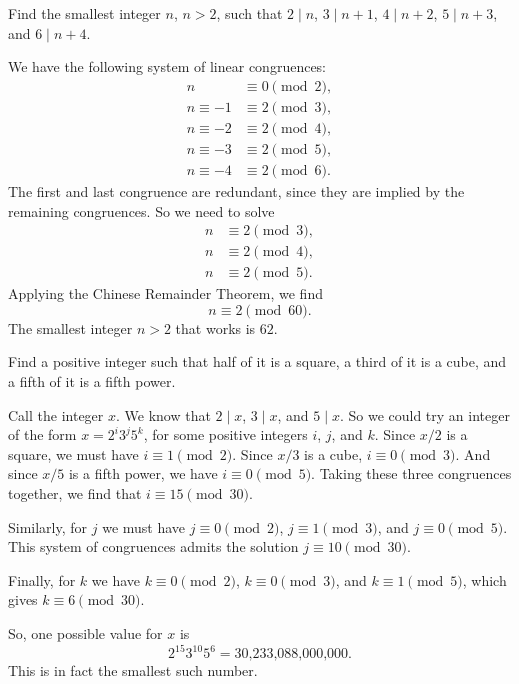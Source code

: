  Find the smallest integer $n$, $n > 2$, such that
$2\mid n$, $3\mid n + 1$, $4\mid n + 2$, $5\mid n + 3$, and
$6\mid n+4$.
\begin{solution}
  We have the following system of linear congruences:
  \begin{align*}
    n&\equiv0\pmod2, \\
    n\equiv-1&\equiv2\pmod3, \\
    n\equiv-2&\equiv2\pmod4, \\
    n\equiv-3&\equiv2\pmod5, \\
    n\equiv-4&\equiv2\pmod6.
  \end{align*}
  The first and last congruence are redundant, since they are implied
  by the remaining congruences. So we need to solve
  \begin{align*}
    n&\equiv2\pmod3, \\
    n&\equiv2\pmod4, \\
    n&\equiv2\pmod5.
  \end{align*}
  Applying the Chinese Remainder Theorem, we find
  \begin{equation*}
    n\equiv2\pmod{60}.
  \end{equation*}
  The smallest integer $n>2$ that works is $62$.
\end{solution}

 Find a positive integer such that half of it is a square,
a third of it is a cube, and a fifth of it is a fifth power.
\begin{solution}
  Call the integer $x$. We know that $2\mid x$, $3\mid x$, and
  $5\mid x$. So we could try an integer of the form $x = 2^i3^j5^k$,
  for some positive integers $i$, $j$, and $k$. Since $x/2$ is a
  square, we must have $i\equiv1\pmod2$. Since $x/3$ is a cube,
  $i\equiv0\pmod3$. And since $x/5$ is a fifth power, we have
  $i\equiv0\pmod5$. Taking these three congruences together, we find
  that $i\equiv15\pmod{30}$.

  Similarly, for $j$ we must have $j\equiv0\pmod2$, $j\equiv1\pmod3$,
  and $j\equiv0\pmod5$. This system of congruences admits the solution
  $j\equiv10\pmod{30}$.

  Finally, for $k$ we have $k\equiv0\pmod2$, $k\equiv0\pmod3$, and
  $k\equiv1\pmod5$, which gives $k\equiv6\pmod{30}$.

  So, one possible value for $x$ is
  \begin{equation*}
    2^{15}3^{10}5^6 = \text{30,233,088,000,000}.
  \end{equation*}
  This is in fact the smallest such number.
\end{solution}
